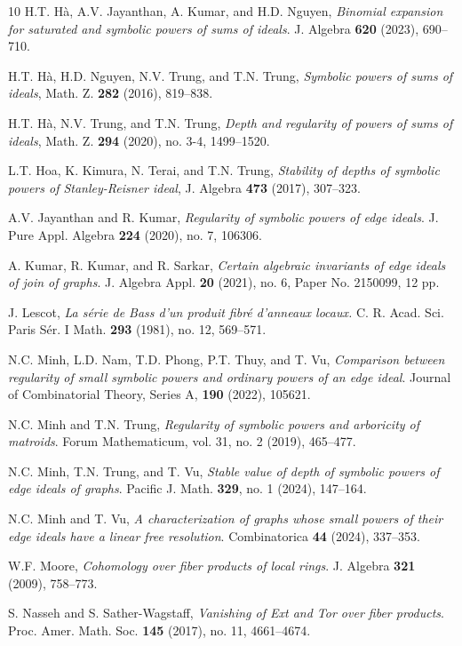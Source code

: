 \documentclass{amsart}
\theoremstyle{plain}
\theoremstyle{definition}
\numberwithin{equation}{section}
\begin{document}
\begin{thebibliography}{10}
H.T. H\`a, A.V. Jayanthan, A. Kumar, and H.D. Nguyen,
\emph{ Binomial expansion for saturated and symbolic powers of sums of ideals}.
J. Algebra {\bf 620} (2023), 690--710.

H.T. H\`a, H.D. Nguyen, N.V. Trung, and T.N. Trung, 
\emph{Symbolic powers of sums of ideals}, 
Math. Z. {\bf 282} (2016), 819--838.

H.T. H\`a, N.V. Trung, and T.N. Trung, 
\emph{Depth and regularity of powers of sums of ideals}, 
Math. Z. {\bf 294} (2020), no. 3-4, 1499--1520.

L.T. Hoa, K. Kimura, N. Terai, and T.N. Trung, 
\emph{Stability of depths of symbolic powers of Stanley-Reisner ideal}, 
J. Algebra {\bf 473} (2017), 307--323.

A.V. Jayanthan and R. Kumar,
\emph{Regularity of symbolic powers of edge ideals}.
J. Pure Appl. Algebra {\bf 224} (2020), no. 7, 106306.

A. Kumar, R. Kumar, and R. Sarkar,
\emph{Certain algebraic invariants of edge ideals of join of graphs}.
 J. Algebra Appl. {\bf 20} (2021), no. 6, Paper No. 2150099, 12 pp. 
 
J. Lescot,
\emph{La s\'erie de Bass d'un produit fibr\'e d'anneaux locaux.}
C. R. Acad. Sci. Paris Sér. I Math. {\bf 293} (1981), no. 12, 569--571.



N.C. Minh, L.D. Nam, T.D. Phong, P.T. Thuy, and T. Vu,
\emph{Comparison between regularity of small symbolic powers and ordinary powers of an edge ideal}.
Journal of Combinatorial Theory, Series A, {\bf 190} (2022), 105621.

N.C. Minh and T.N. Trung,
\emph{Regularity of symbolic powers and arboricity of matroids}. 
Forum Mathematicum, vol. 31, no. 2 (2019), 465--477.

N.C. Minh, T.N. Trung, and T. Vu,
\emph{Stable value of depth of symbolic powers of edge ideals of graphs}.
Pacific J. Math. {\bf 329}, no. 1 (2024), 147--164.

N.C. Minh and T. Vu,
\emph{A characterization of graphs whose small powers of their edge ideals have a linear free resolution}.
Combinatorica {\bf 44} (2024), 337--353.

W.F. Moore,
\emph{Cohomology over fiber products of local rings}.
J. Algebra {\bf 321} (2009), 758--773.

S. Nasseh and S. Sather-Wagstaff,
\emph{Vanishing of Ext and Tor over fiber products}.
Proc. Amer. Math. Soc. {\bf 145} (2017), no. 11, 4661--4674.


\end{thebibliography}
\end{document}
